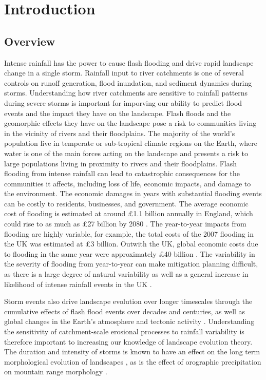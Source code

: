 \chapter{Introduction}
\label{chapter_intro}
%

\section{Overview}

Intense rainfall has the power to cause flash flooding and drive rapid landscape change in a single storm. Rainfall input to river catchments is one of several controls on runoff generation, flood inundation, and sediment dynamics during storms. Understanding how river catchments are sensitive to rainfall patterns during severe storms is important for imporving our ability to predict flood events and the impact they have on the landscape.  Flash floods and the geomorphic effects they have on the landscape pose a risk to communities living in the vicinity of rivers and their floodplains. The majority of the world's population live in temperate or sub-tropical climate regions on the Earth, where water is one of the main forces acting on the landscape and presents a risk to large populations living in proximity to rivers and their floodplains. Flash flooding from intense rainfall can lead to catastrophic consequences for the communities it affects, including loss of life, economic impacts, and damage to the environment. The economic damages in years with substantial flooding events can be costly to residents, businesses, and government. The average economic cost of flooding is estimated at around £1.1 billion annually in England, which could rise to as much as £27 billion by 2080 \citep{bennett2014flood}. The year-to-year impacts from flooding are highly variable, for example, the total costs of the 2007 flooding in the UK was estimated at £3 billion. Outwith the UK, global economic costs due to flooding in the same year were approximately £40 billion \citep{pitt2008pitt}. The variability in the severity of flooding from year-to-year can make mitigation planning difficult, as there is a large degree of natural variability as well as a general increase in likelihood of intense rainfall events in the UK \citep{Kendon2014}. 

Storm events also drive landscape evolution over longer timescales through the cumulative effects of flash flood events over decades and centuries, as well as global changes in the Earth's atmosphere and tectonic activity \citep{Molnar1990,Molnar2001,whipple2006orogen}. Understanding the sensitivity of catchment-scale erosional processes to rainfall variability is therefore important to increasing our knowledge of landscape evolution theory. The duration and intensity of storms is known to have an effect on the long term morphological evolution of landscapes \citep{Solyom2004,solyom2007importance}, as is the effect of orographic precipitation on mountain range morphology \citep{han2015measuring}.

